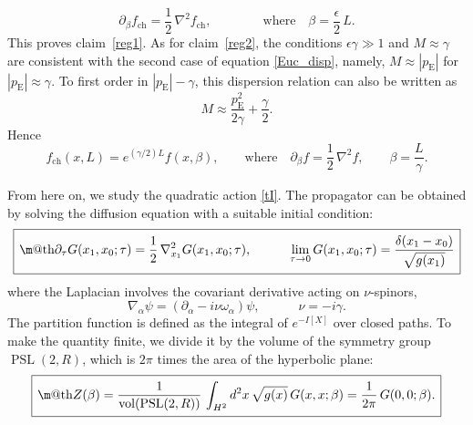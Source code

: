 \documentclass[12pt]{article}
\makeatletter
\newcommand*{\wideboxed}[1]{\setlength{\fboxsep}{1ex}%
  \fbox{\m@th$\displaystyle#1$}}
\newcommand{\RR}{\mathbb{R}}
\DeclareMathOperator{\PSL}{PSL}
\DeclareMathOperator{\HH}{H}
\newcommand{\ch}{\text{ch}}
\newcommand{\Euc}{\mathrm{E}}
\def\HH{H}
\def\RR{R}
\makeatother
\begin{document}
\begin{equation}
\partial_{\beta}f_{\ch}=\frac{1}{2}\,\nabla^2f_{\ch},\qquad\qquad
\text{where}\quad
\beta=\frac{\epsilon}{2}\,L.
\end{equation}
This proves claim~\ref{reg1}. As for claim~\ref{reg2}, the conditions $\epsilon\gamma\gg 1$ and $M\approx\gamma$ are consistent with the second case of equation \eqref{Euc_disp}, namely, $M\approx|p_{\Euc}|$ for $|p_{\Euc}|\approx\gamma$. To first order in $|p_{\Euc}|-\gamma$, this dispersion relation can also be written as
\begin{equation}
M\approx \frac{p_{\Euc}^2}{2\gamma}+\frac{\gamma}{2}.
\end{equation}
Hence
\begin{equation}
f_{\ch}(x,L)=e^{(\gamma/2)L}f(x,\beta),\qquad
\text{where}\quad
\partial_{\beta}f=\frac{1}{2}\,\nabla^2f,\qquad
\beta=\frac{L}{\gamma}.
\end{equation}

From here on, we study the quadratic action \eqref{tI}. The propagator can be obtained by solving the diffusion equation with a suitable initial condition:
\begin{equation}\label{diffusion}
\wideboxed{
\partial_{\tau}G(x_1,x_0;\tau)=\frac{1}{2}\,\nabla_{x_1}^{2}G(x_1,x_0;\tau),
\qquad\quad
\lim_{\tau\to 0}G(x_1,x_0;\tau)=\frac{\delta(x_1-x_0)}{\sqrt{g(x_1)}}
}
\end{equation}
where the Laplacian involves the covariant derivative acting on $\nu$-spinors,
\begin{equation} \label{coder}
\nabla_{\alpha}\psi
=(\partial_{\alpha}-i\nu\omega_{\alpha})\psi,\qquad\quad
\nu=-i\gamma.
\end{equation}
The partition function is defined as the integral of $e^{-I[X]}$ over closed paths. To make the quantity finite, we divide it by the volume of the symmetry group $\PSL(2,\RR)$, which is $2\pi$ times the area of the hyperbolic plane:
\begin{equation} \label{Zdef}
\wideboxed{
Z(\beta)=\frac{1}{\operatorname{vol}(\PSL(2,\RR))}\,
\int_{\HH^2}d^2x\,\sqrt{g(x)}\,G(x,x;\beta)
=\frac{1}{2\pi}\,G(0,0;\beta).
}
\end{equation}
\end{document}
